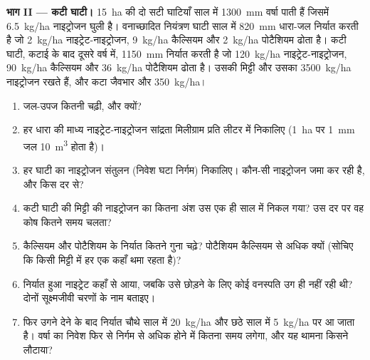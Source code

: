 \begin{problem}
\medskip
\noindent\textbf{भाग II --- कटी घाटी।}
\qty{15}{ha} की दो सटी घाटियाँ साल में \qty{1300}{mm} वर्षा पाती हैं
जिसमें \qty{6.5}{kg/ha} नाइट्रोजन घुली है। वनाच्छादित नियंत्रण घाटी साल
में \qty{820}{mm} धारा-जल निर्यात करती है जो \qty{2}{kg/ha}
नाइट्रेट-नाइट्रोजन, \qty{9}{kg/ha} कैल्सियम और \qty{2}{kg/ha} पोटैशियम
ढोता है। कटी घाटी, कटाई के बाद दूसरे वर्ष में, \qty{1150}{mm} निर्यात
करती है जो \qty{120}{kg/ha} नाइट्रेट-नाइट्रोजन, \qty{90}{kg/ha}
कैल्सियम और \qty{36}{kg/ha} पोटैशियम ढोता है। उसकी मिट्टी और उसका 
\qty{3500}{kg/ha} नाइट्रोजन रखते हैं, और कटा जैवभार और \qty{350}{kg/ha}।
\begin{enumerate}[resume]
  \item जल-उपज कितनी चढ़ी, और क्यों?
  \item हर धारा की माध्य नाइट्रेट-नाइट्रोजन सांद्रता मिलीग्राम प्रति
        लीटर में निकालिए (\qty{1}{ha} पर \qty{1}{mm} जल
        \qty{10}{m^3} होता है)।
  \item हर घाटी का नाइट्रोजन संतुलन (निवेश घटा निर्गम) निकालिए। कौन-सी
        नाइट्रोजन जमा कर रही है, और किस दर से?
  \item कटी घाटी की मिट्टी की नाइट्रोजन का कितना अंश उस एक ही साल में
        निकल गया? उस दर पर वह कोष कितने समय चलता?
  \item कैल्सियम और पोटैशियम के निर्यात कितने गुना चढ़े? पोटैशियम
        कैल्सियम से अधिक क्यों (सोचिए कि किसी मिट्टी में हर एक कहाँ
        थमा रहता है)?
  \item निर्यात हुआ नाइट्रेट कहाँ से आया, जबकि उसे छोड़ने के लिए कोई
        वनस्पति उग ही नहीं रही थी? दोनों सूक्ष्मजीवी चरणों के नाम
        बताइए।
  \item फिर उगने देने के बाद निर्यात चौथे साल में \qty{20}{kg/ha} और
        छठे साल में \qty{5}{kg/ha} पर आ जाता है। वर्षा का निवेश फिर से
        निर्गम से अधिक होने में कितना समय लगेगा, और यह थामना किसने
        लौटाया?
\end{enumerate}


\end{problem}
